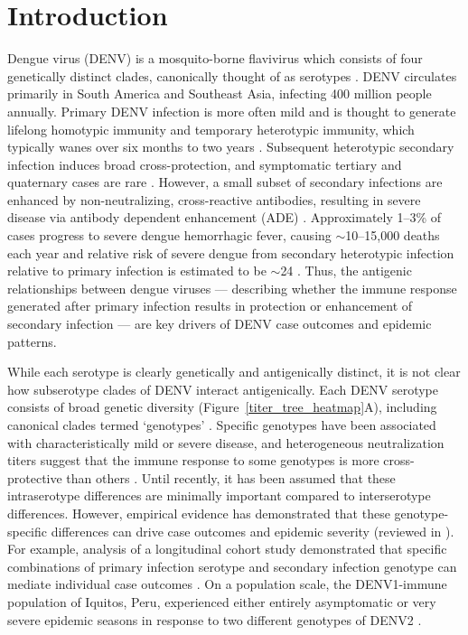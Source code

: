 \documentclass[11pt,oneside,letterpaper]{article}
\begin{document}
\section*{Introduction}
Dengue virus (DENV) is a mosquito-borne flavivirus which consists of four genetically distinct clades, canonically thought of as serotypes \citep{lanciotti1997molecular}.
DENV circulates primarily in South America and Southeast Asia, infecting 400 million people annually.
Primary DENV infection is more often mild and is thought to generate lifelong homotypic immunity and temporary heterotypic immunity, which typically wanes over six months to two years \citep{sabin1952research,reich2013interactions,katzelnick2016neutralizing}.
Subsequent heterotypic secondary infection induces broad cross-protection, and symptomatic tertiary and quaternary cases are rare  \citep{gibbons2007analysis,olkowski2013reduced}.
However, a small subset of secondary infections are enhanced by non-neutralizing, cross-reactive antibodies, resulting in severe disease via antibody dependent enhancement (ADE) \citep{halstead1979vivo,katzelnick2017antibody,sangkawibha1984risk}.
Approximately 1--3\% of cases progress to severe dengue hemorrhagic fever, causing $\sim$10--15,000 deaths each year \citep{bhatt2013global} and relative risk of severe dengue from secondary heterotypic infection relative to primary infection is estimated to be $\sim$24 \citep{mizumoto2014risk}.
Thus, the antigenic relationships between dengue viruses --- describing whether the immune response generated after primary infection results in protection or enhancement of secondary infection --- are key drivers of DENV case outcomes and epidemic patterns.

While each serotype is clearly genetically and antigenically distinct, it is not clear how subserotype clades of DENV interact antigenically.
Each DENV serotype consists of broad genetic diversity (Figure~\ref{titer_tree_heatmap}A), including canonical clades termed `genotypes'  \citep{rico1990molecular,twiddy2003inferring}.
Specific genotypes have been associated with characteristically mild or severe disease, and heterogeneous neutralization titers suggest that the immune response to some genotypes is more cross-protective than others \citep{gentry1982identification,russell1967dengue}.
Until recently, it has been assumed that these intraserotype differences are minimally important compared to interserotype differences.
However, empirical evidence has demonstrated that these genotype-specific differences can drive case outcomes and epidemic severity (reviewed in \citet{holmes2003origin}).
For example, analysis of a longitudinal cohort study demonstrated that specific combinations of primary infection serotype and secondary infection genotype can mediate individual case outcomes \citep{ohainle2011dynamics}.
On a population scale, the DENV1-immune population of Iquitos, Peru, experienced either entirely asymptomatic or very severe epidemic seasons in response to two different genotypes of DENV2 \citep{kochel2002effect}.
\end{document}
